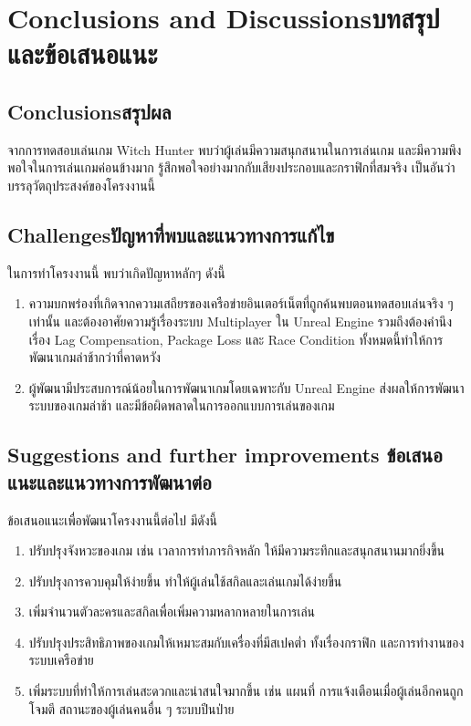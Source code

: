 \chapter{\ifenglish Conclusions and Discussions\else บทสรุปและข้อเสนอแนะ\fi}

\section{\ifenglish Conclusions\else สรุปผล\fi}

จากการทดสอบเล่นเกม Witch Hunter พบว่าผู้เล่นมีความสนุกสนานในการเล่นเกม และมีความพึงพอใจในการเล่นเกมค่อนข้างมาก
รู้สึกพอใจอย่างมากกับเสียงประกอบและกราฟิกที่สมจริง เป็นอันว่าบรรลุวัตถุประสงค์ของโครงงานนี้

\section{\ifenglish Challenges\else ปัญหาที่พบและแนวทางการแก้ไข\fi}

ในการทำโครงงานนี้ พบว่าเกิดปัญหาหลักๆ ดังนี้
\begin{enumerate}
    \item ความบกพร่องที่เกิดจากความเสถียรของเครือข่ายอินเตอร์เน็ตที่ถูกค้นพบตอนทดสอบเล่นจริง ๆ เท่านั้น 
    และต้องอาศัยความรู้เรื่องระบบ Multiplayer ใน Unreal Engine รวมถึงต้องคำนึงเรื่อง Lag Compensation, 
    Package Loss และ Race Condition ทั้งหมดนี้ทำให้การพัฒนาเกมล่าช้ากว่าที่คาดหวัง
    \item ผู้พัฒนามีประสบการณ์น้อยในการพัฒนาเกมโดยเฉพาะกับ Unreal Engine ส่งผลให้การพัฒนาระบบของเกมล่าช้า 
    และมีข้อผิดพลาดในการออกแบบการเล่นของเกม
\end{enumerate}

\section{\ifenglish%
Suggestions and further improvements
\else%
ข้อเสนอแนะและแนวทางการพัฒนาต่อ
\fi
}

ข้อเสนอแนะเพื่อพัฒนาโครงงานนี้ต่อไป มีดังนี้
\begin{enumerate}
    \item ปรับปรุงจังหวะของเกม เช่น เวลาการทำภารกิจหลัก ให้มีความระทึกและสนุกสนานมากยิ่งขึ้น
    \item ปรับปรุงการควบคุมให้ง่ายขึ้น ทำให้ผู้เล่นใช้สกิลและเล่นเกมได้ง่ายขึ้น
    \item เพิ่มจำนวนตัวละครและสกิลเพื่อเพิ่มความหลากหลายในการเล่น
    \item ปรับปรุงประสิทธิภาพของเกมให้เหมาะสมกับเครื่องที่มีสเปคต่ำ ทั้งเรื่องกราฟิก และการทำงานของ
    ระบบเครือข่าย
    \item เพิ่มระบบที่ทำให้การเล่นสะดวกและน่าสนใจมากขึ้น เช่น แผนที่ การแจ้งเตือนเมื่อผู้เล่นอีกคนถูกโจมตี สถานะของผู้เล่นคนอื่น ๆ ระบบปีนป่าย
\end{enumerate}
